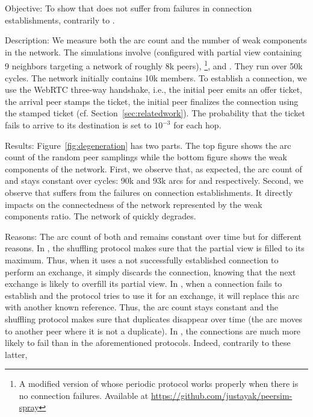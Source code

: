 \begin{asparadesc}
\item[Objective:] To show that \SPRAY does not suffer from failures in
  connection establishments, contrarily to \SCAMP.
\item[Description:] We measure both the arc count and the number of weak
  components in the network. The simulations involve \CYCLON (configured with
  partial view containing 9 neighbors targeting a network of roughly 8k
  peers), \SCAMP\footnote{A modified version of \SCAMP whose periodic protocol
    works properly when there is no connection failures. Available at
    \url{https://github.com/justayak/peersim-spray}}, and \SPRAY. They run over
  50k cycles. The network initially contains 10k members.  To establish a
  connection, we use the WebRTC three-way handshake, i.e., the initial peer
  emits an offer ticket, the arrival peer stamps the ticket, the initial peer
  finalizes the connection using the stamped ticket
  (cf. Section~\ref{sec:relatedwork}). The probability that the ticket fails to
  arrive to its destination is set to $10^{-3}$ for each hop.
\item[Results:] Figure~\ref{fig:degeneration} has two parts. The
  top figure shows the arc count of the random peer samplings while the bottom
  figure shows the weak components of the network.  First, we observe that, as
  expected, the arc count of \CYCLON and \SPRAY stays constant over cycles: 90k
  and 93k arcs for \CYCLON and \SPRAY respectively. Second, we observe that
  \SCAMP suffers from the failures on connection establishments. It directly
  impacts on the connectedness of the network represented by the weak
  components ratio. The network of \SCAMP quickly degrades.
\item[Reasons:] The arc count of both \CYCLON and \SPRAY remains constant over
  time but for different reasons. In \CYCLON, the shuffling protocol makes sure
  that the partial view is filled to its maximum. Thus, when it uses a not
  successfully established connection to perform an exchange, it simply discards
  the connection, knowing that the next exchange is likely to overfill its
  partial view. In \SPRAY, when a connection fails to establish and the protocol
  tries to use it for an exchange, it will replace this arc with another known
  reference. Thus, the arc count stays constant and the shuffling protocol makes
  sure that duplicates disappear over time (the arc moves to another peer where
  it is not a duplicate). In \SCAMP, the connections are much more likely to
  fail than in the aforementioned protocols. Indeed, contrarily to these latter,

\end{asparadesc}

